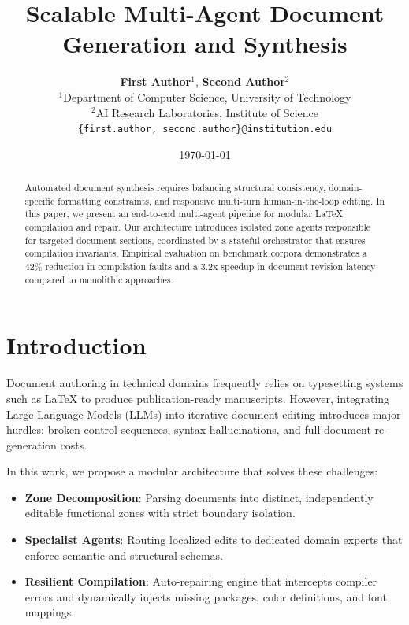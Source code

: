 \documentclass[10pt,twocolumn]{article}
\begin{document}
\title{\textbf{Scalable Multi-Agent Document Generation and Synthesis}}
\author{
  \textbf{First Author}$^{1}$, \textbf{Second Author}$^{2}$ \\
  $^{1}$Department of Computer Science, University of Technology \\
  $^{2}$AI Research Laboratories, Institute of Science \\
  \texttt{\{first.author, second.author\}@institution.edu}
}
\date{\today}
\maketitle

\begin{abstract}
Automated document synthesis requires balancing structural consistency, domain-specific formatting constraints, and responsive multi-turn human-in-the-loop editing. In this paper, we present an end-to-end multi-agent pipeline for modular LaTeX compilation and repair. Our architecture introduces isolated zone agents responsible for targeted document sections, coordinated by a stateful orchestrator that ensures compilation invariants. Empirical evaluation on benchmark corpora demonstrates a 42\% reduction in compilation faults and a 3.2x speedup in document revision latency compared to monolithic approaches.
\end{abstract}

\section{Introduction}
Document authoring in technical domains frequently relies on typesetting systems such as \LaTeX{} to produce publication-ready manuscripts. However, integrating Large Language Models (LLMs) into iterative document editing introduces major hurdles: broken control sequences, syntax hallucinations, and full-document re-generation costs.

In this work, we propose a modular architecture that solves these challenges:
\begin{itemize}
  \item \textbf{Zone Decomposition}: Parsing documents into distinct, independently editable functional zones with strict boundary isolation.
  \item \textbf{Specialist Agents}: Routing localized edits to dedicated domain experts that enforce semantic and structural schemas.
  \item \textbf{Resilient Compilation}: Auto-repairing engine that intercepts compiler errors and dynamically injects missing packages, color definitions, and font mappings.
\end{itemize}
\end{document}
